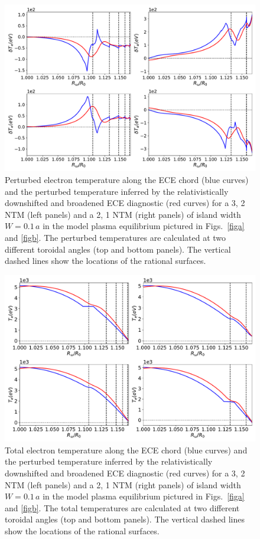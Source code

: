 \documentclass[12pt,prb,aps]{revtex4-1}
\begin{document}
\begin{figure}
\centerline{\includegraphics[width=\textwidth]{Fig15.pdf}}
\caption{Perturbed electron temperature along the ECE chord (blue curves) and the perturbed temperature inferred by the relativistically downshifted and  broadened ECE diagnostic (red curves) for a
3, 2 NTM (left panels) and a 2, 1 NTM (right panels) of island width $W=0.1\,a$ in the model plasma equilibrium pictured in Figs.~\ref{figa} and \ref{figb}.
The perturbed temperatures are calculated  at two different toroidal angles (top and bottom panels). 
The vertical dashed lines show the locations of the rational surfaces. 
\label{fig13}}
\end{figure}

\begin{figure}
\centerline{\includegraphics[width=\textwidth]{Fig16.pdf}}
\caption{Total electron temperature along the ECE chord (blue curves) and the perturbed temperature inferred by the relativistically downshifted and broadened ECE diagnostic (red curves) for a
3, 2 NTM (left panels) and a 2, 1 NTM (right panels) of island width $W=0.1\,a$  in the model plasma equilibrium pictured in Figs.~\ref{figa} and \ref{figb}.
The total temperatures are calculated  at two different toroidal angles (top and bottom panels).  The vertical dashed lines show the locations of the rational surfaces. \label{fig14}}
\end{figure}
\end{document}
